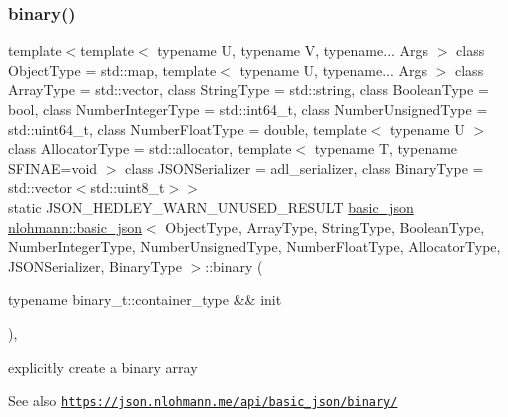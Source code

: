 \subsubsection{\texorpdfstring{binary()}{binary()}\hspace{0.1cm}{\footnotesize\ttfamily [3/4]}}
{\footnotesize\ttfamily template$<$template$<$ typename U, typename V, typename... Args $>$ class Object\+Type = std\+::map, template$<$ typename U, typename... Args $>$ class Array\+Type = std\+::vector, class String\+Type  = std\+::string, class Boolean\+Type  = bool, class Number\+Integer\+Type  = std\+::int64\+\_\+t, class Number\+Unsigned\+Type  = std\+::uint64\+\_\+t, class Number\+Float\+Type  = double, template$<$ typename U $>$ class Allocator\+Type = std\+::allocator, template$<$ typename T, typename S\+F\+I\+N\+A\+E=void $>$ class J\+S\+O\+N\+Serializer = adl\+\_\+serializer, class Binary\+Type  = std\+::vector$<$std\+::uint8\+\_\+t$>$$>$ \\
static J\+S\+O\+N\+\_\+\+H\+E\+D\+L\+E\+Y\+\_\+\+W\+A\+R\+N\+\_\+\+U\+N\+U\+S\+E\+D\+\_\+\+R\+E\+S\+U\+LT \hyperlink{classnlohmann_1_1basic__json}{basic\+\_\+json} \hyperlink{classnlohmann_1_1basic__json}{nlohmann\+::basic\+\_\+json}$<$ Object\+Type, Array\+Type, String\+Type, Boolean\+Type, Number\+Integer\+Type, Number\+Unsigned\+Type, Number\+Float\+Type, Allocator\+Type, J\+S\+O\+N\+Serializer, Binary\+Type $>$\+::binary (\begin{DoxyParamCaption}\item[{typename binary\+\_\+t\+::container\+\_\+type \&\&}]{init }\end{DoxyParamCaption})\hspace{0.3cm}{\ttfamily [inline]}, {\ttfamily [static]}}



explicitly create a binary array 

\begin{DoxySeeAlso}{See also}
\href{https://json.nlohmann.me/api/basic_json/binary/}{\tt https\+://json.\+nlohmann.\+me/api/basic\+\_\+json/binary/} 
\end{DoxySeeAlso}
\mbox{\label{classnlohmann_1_1basic__json_a534d4793bcfa81a307b7f3f7eab2cff9}} 
